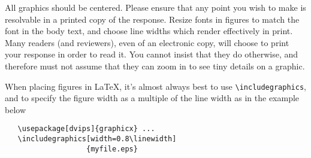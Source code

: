 \documentclass[rebuttal]{cvpr}
\begin{document}
All graphics should be centered.  Please ensure that any point you wish to make is resolvable in a printed copy of the response.  Resize fonts in figures to match the font in the body text, and choose line widths which render effectively in print.  Many readers (and reviewers), even of an electronic copy, will choose to print your response in order to read it.  You cannot insist that they do otherwise, and therefore must not assume that they can zoom in to see tiny details on a graphic.

When placing figures in \LaTeX, it's almost always best to use \verb+\includegraphics+, and to specify the  figure width as a multiple of the line width as in the example below
{\small\begin{verbatim}
   \usepackage[dvips]{graphicx} ...
   \includegraphics[width=0.8\linewidth]
                   {myfile.eps}
\end{verbatim}
}


{\small


}
\end{document}
